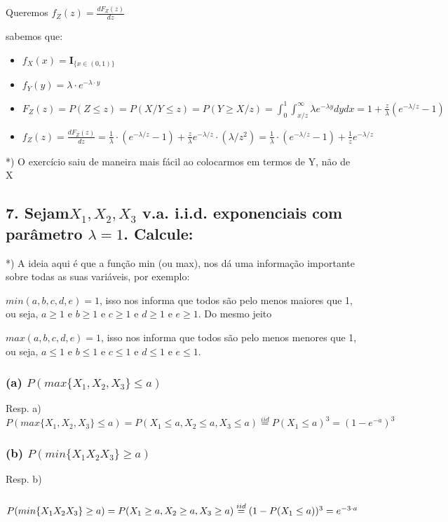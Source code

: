 \documentclass[portuguese]{article}
\begin{document}
Queremos $f_{Z}(z)=\frac{dF_{Z}(z)}{dz}$

sabemos que:
\begin{itemize}
\item $f_{X}(x)=\mathbf{I}_{\{x\in(0,1)\}}$
\item $f_{Y}(y)=\lambda\cdot e^{-\lambda\cdot y}$
\item $F_{Z}(z)=P(Z\leq z)=P(X/Y\leq z)=P(Y\ge X/z)=\int_{0}^{1}\int_{x/z}^{\infty}\lambda e^{-\lambda y}dydx=1+\frac{z}{\lambda}(e^{-\lambda/z}-1)$
\item $f_{Z}(z)=\frac{dF_{Z}(z)}{dz}=\frac{1}{\lambda}\cdot(e^{-\lambda/z}-1)+\frac{z}{\lambda}e^{-\lambda/z}\cdot(\lambda/z^{2})=\frac{1}{\lambda}\cdot(e^{-\lambda/z}-1)+\frac{1}{z}e^{-\lambda/z}$
\end{itemize}
{*}) O exercício saiu de maneira mais fácil ao colocarmos em termos
de Y, não de X


\subsection*{\textmd{7. Sejam$X_{1},X_{2},X_{3}$ v.a. i.i.d. exponenciais com
parâmetro $\lambda=1$. Calcule: }}

{*}) A ideia aqui é que a função min (ou max), nos dá uma informação
importante sobre todas as suas variáveis, por exemplo:

$min(a,b,c,d,e)=1$, isso nos informa que todos são pelo menos maiores
que 1, ou seja, $a\geq1$ e $b\geq1$ e $c\geq1$ e $d\geq1$ e $e\geq1$.
Do mesmo jeito

$max(a,b,c,d,e)=1$, isso nos informa que todos são pelo menos menores
que 1, ou seja, $a\leq1$ e $b\leq1$ e $c\leq1$ e $d\leq1$ e $e\leq1$.


\subsubsection*{\textmd{(a) $P(max\{X_{1},X_{2},X_{3}\}\leq a)$}}

Resp. a) $P(max\{X_{1},X_{2},X_{3}\}\leq a)=P(X_{1}\leq a,X_{2}\leq a,X_{3}\leq a)\overset{iid}{=}P(X_{1}\leq a)^{3}=(1-e^{-a})^{3}$


\subsubsection*{\textmd{(b) $P(min\{X_{1}X_{2}X_{3}\}\geq a)$}}

Resp. b)


\subsubsection*{\textmd{$P(min\{X_{1}X_{2}X_{3}\}\geq a)=P(X_{1}\geq a,X_{2}\geq a,X_{3}\geq a)\protect\overset{iid}{=}(1-P(X_{1}\leq a))^{3}=e^{-3\cdot a}$}}
\end{document}
